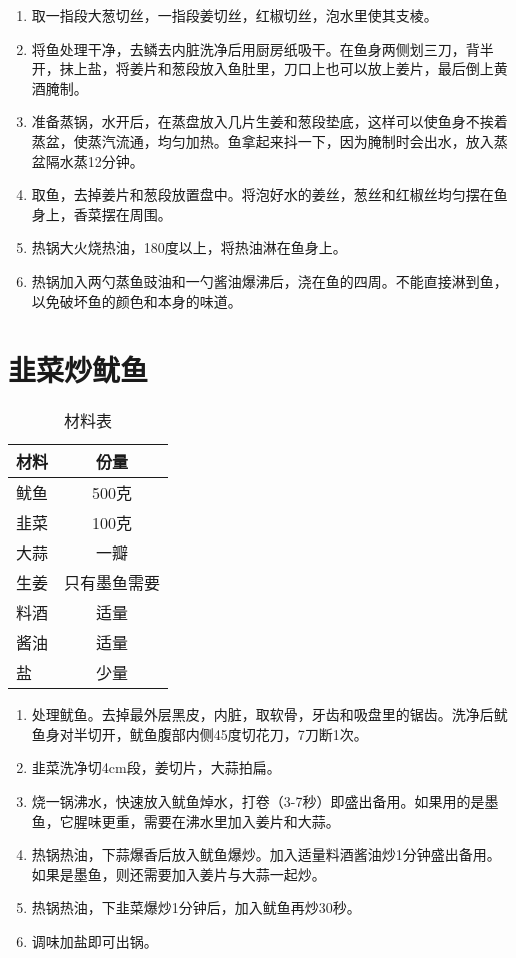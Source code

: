 \begin{enumerate}
    \item 取一指段大葱切丝，一指段姜切丝，红椒切丝，泡水里使其支棱。
    \item 将鱼处理干净，去鳞去内脏洗净后用厨房纸吸干。在鱼身两侧划三刀，背半开，抹上盐，将姜片和葱段放入鱼肚里，刀口上也可以放上姜片，最后倒上黄酒腌制。
    \item 准备蒸锅，水开后，在蒸盘放入几片生姜和葱段垫底，这样可以使鱼身不挨着蒸盆，使蒸汽流通，均匀加热。鱼拿起来抖一下，因为腌制时会出水，放入蒸盆隔水蒸12分钟。
    \item 取鱼，去掉姜片和葱段放置盘中。将泡好水的姜丝，葱丝和红椒丝均匀摆在鱼身上，香菜摆在周围。
    \item 热锅大火烧热油，180度以上，将热油淋在鱼身上。
    \item 热锅加入两勺蒸鱼豉油和一勺酱油爆沸后，浇在鱼的四周。不能直接淋到鱼，以免破坏鱼的颜色和本身的味道。
\end{enumerate}


\section{韭菜炒鱿鱼}

\begin{table}[H]
    \centering
    \begin{tabular}{|l||c|}\hline
     \textbf{材料}    &  \textbf{份量}\\ \hline\hline
    鱿鱼    &  500克 \\ \hline
    韭菜    & 100克 \\ \hline
    大蒜  &  一瓣\\ \hline
    生姜 & 只有墨鱼需要\\ \hline
    料酒 &  适量 \\ \hline
    酱油 & 适量 \\ \hline
    盐  & 少量 \\ \hline
    \end{tabular}
    \caption{材料表}
\end{table}

\begin{enumerate}
    \item 处理鱿鱼。去掉最外层黑皮，内脏，取软骨，牙齿和吸盘里的锯齿。洗净后鱿鱼身对半切开，鱿鱼腹部内侧45度切花刀，7刀断1次。
    \item 韭菜洗净切4cm段，姜切片，大蒜拍扁。
    \item 烧一锅沸水，快速放入鱿鱼焯水，打卷（3-7秒）即盛出备用。如果用的是墨鱼，它腥味更重，需要在沸水里加入姜片和大蒜。
    \item 热锅热油，下蒜爆香后放入鱿鱼爆炒。加入适量料酒酱油炒1分钟盛出备用。如果是墨鱼，则还需要加入姜片与大蒜一起炒。
    \item 热锅热油，下韭菜爆炒1分钟后，加入鱿鱼再炒30秒。
    \item 调味加盐即可出锅。
\end{enumerate}

